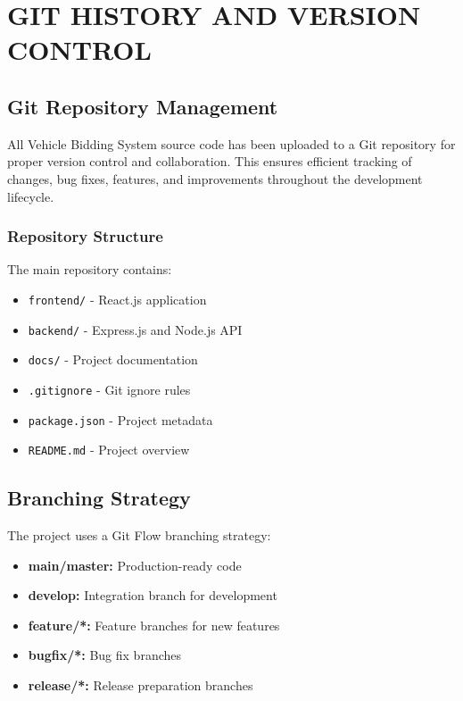 \chapter{GIT HISTORY AND VERSION CONTROL}

\section{Git Repository Management}

All Vehicle Bidding System source code has been uploaded to a Git repository for proper version control and collaboration. This ensures efficient tracking of changes, bug fixes, features, and improvements throughout the development lifecycle.

\subsection{Repository Structure}

The main repository contains:

\begin{itemize}
    \item \texttt{frontend/} - React.js application
    \item \texttt{backend/} - Express.js and Node.js API
    \item \texttt{docs/} - Project documentation
    \item \texttt{.gitignore} - Git ignore rules
    \item \texttt{package.json} - Project metadata
    \item \texttt{README.md} - Project overview
\end{itemize}

\section{Branching Strategy}

The project uses a Git Flow branching strategy:

\begin{itemize}
    \item \textbf{main/master:} Production-ready code
    \item \textbf{develop:} Integration branch for development
    \item \textbf{feature/*:} Feature branches for new features
    \item \textbf{bugfix/*:} Bug fix branches
    \item \textbf{release/*:} Release preparation branches
\end{itemize}

